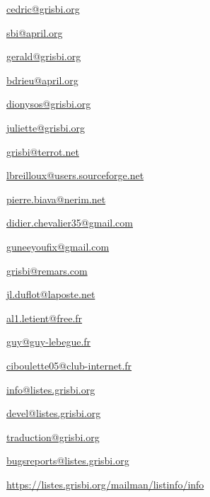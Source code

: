\urldef{\urlCedricAugerEmail}%
\url{cedric@grisbi.org}     %

\urldef{\urlSebastienBlondeelEmail}%
\url{sbi@april.org}%

\urldef{\urlGeraldNielEmail}%
\url{gerald@grisbi.org}%

\urldef{\urlBenjaminDrieuEmail}%
\url{bdrieu@april.org}     %

\urldef{\urlDionysosEmail}%
\url{dionysos@grisbi.org}     %

\urldef{\urlJulietteEmail}%
\url{juliette@grisbi.org}     %

\urldef{\urlFrancoisTerrotEmail}%
\url{grisbi@terrot.net}     %

\urldef{\urlLoicBreillouxEmail}%
\url{lbreilloux@users.sourceforge.net}    %

\urldef{\urlPierreBiavaEmail}%
\url{pierre.biava@nerim.net}     %

\urldef{\urlDidierChevalierEmail}%
\url{didier.chevalier35@gmail.com}     %

\urldef{\urlWilliamOllivierEmail}%
\url{guneeyoufix@gmail.com}     %

\urldef{\urlMickaelRemarsEmail}%
\url{grisbi@remars.com}     %

\urldef{\urlJeanLucDuflotEmail}%
\url{jl.duflot@laposte.net}     %

\urldef{\urlAlainLetientEmail}%
\url{al1.letient@free.fr}     %

\urldef{\urlGuyLebegueEmail}%
\url{guy@guy-lebegue.fr}     %

\urldef{\urlMicheleBondilEmail}%
\url{ciboulette05@club-internet.fr}     %

\urldef{\urlListInfoEmail}%
\url{info@listes.grisbi.org}     %

\urldef{\urlListDevelEmail}%
\url{devel@listes.grisbi.org}     %

\urldef{\urlListTraductionEmail}%
\url{traduction@grisbi.org}  %

\urldef{\urlListBugsreport}%
\url{bugsreports@listes.grisbi.org}     %

\urldef{\urlListSF}%
\url{https://listes.grisbi.org/mailman/listinfo/info}     %


